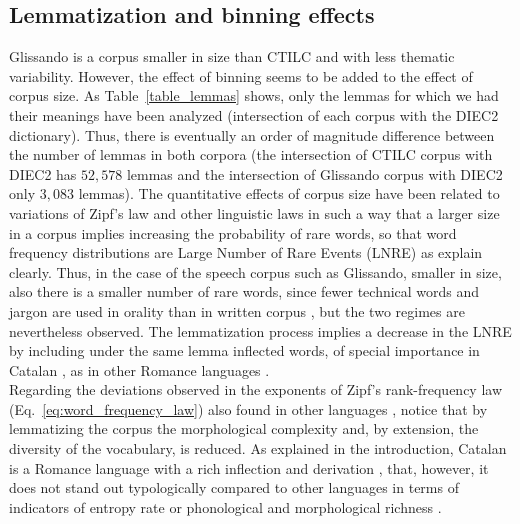 \documentclass[10pt,letterpaper]{article}
\begin{document}
\subsection*{Lemmatization and binning effects}

Glissando is a corpus smaller in size than CTILC and with less thematic variability. However, the effect of binning seems to be added to the effect of corpus size. As Table~\ref{table_lemmas} shows, only the lemmas for which we had their meanings have been analyzed (intersection of each corpus with the DIEC2 dictionary). Thus, there is eventually an order of magnitude difference between the number of lemmas in both corpora (the intersection of CTILC corpus with DIEC2 has $52,578$ lemmas and the intersection of Glissando corpus with DIEC2 only $3,083$ lemmas). The quantitative effects of corpus size have been related to variations of Zipf's law and other linguistic laws in such a way that a larger size in a corpus implies increasing the probability of rare words, so that word frequency distributions are Large Number of Rare Events (LNRE) as \cite{baayen2001word} explain clearly. Thus, in the case of the speech corpus such as Glissando, smaller in size, also there is a smaller number of rare words, since fewer technical words and jargon are used in orality than in written corpus \cite{johansson2008lexical}, but the two regimes are nevertheless observed. The lemmatization process implies a decrease in the LNRE by including under the same lemma inflected words, of special importance in Catalan \cite{diccionari_1998}, as in other Romance languages \cite{kabatek2011romance, Montermini2010}.  \\ 

Regarding the deviations observed in the exponents of Zipf's rank-frequency law (Eq.~\ref{eq:word_frequency_law}) also found in other languages \cite{yu2018zipfs}, notice that by lemmatizing the corpus the morphological complexity and, by extension, the diversity of the vocabulary, is reduced. As explained in the introduction, Catalan is a Romance language with a rich inflection and derivation \cite{kabatek2011romance,clua2002,domenech_estopa_2011}, that, however, it does not stand out typologically compared to other languages in terms of indicators of entropy rate or phonological and morphological richness \cite{bentz2018adaptive,bentz2016, Bentzetal2017}. 
\end{document}
